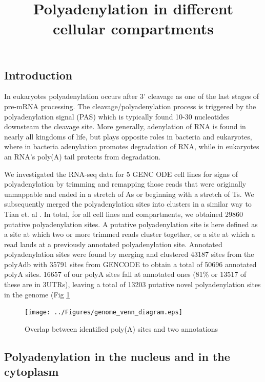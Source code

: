 \documentclass[a4paper]{article}
\title{Polyadenylation in different cellular compartments}
\begin{document}
 

\maketitle

\subsection{Introduction}
In eukaryotes polyadenylation occurs after 3' cleavage as one
of the last stages of pre-mRNA processing. The cleavage/polyadenylation process
is triggered by the polyadenylation signal (PAS) which is typically found 10-30
nucleotides downsteam the cleavage site. More generally, adenylation of RNA is
found in nearly all kingdoms of life, but plays opposite roles in bacteria and
eukaryotes, where in bacteria adenylation promotes degradation of RNA, while in
eukaryotes an RNA's poly(A) tail protects from degradation.

We investigated the RNA-seq data for 5 GENC ODE cell lines for signs of
polyadenylation by trimming and remapping those reads that were originally
unmappable and ended in a stretch of As or beginning with a stretch of Ts. We
subsequently merged the polyadenylation sites into clusters in a similar way to
Tian et. al \cite{tian_large-scale_2005}. In total, for all cell lines and
compartments, we obtained 29860 putative polyadenylation sites. A putative
polyadenylation site is here defined as a site at which two or more trimmed
reads cluster together, or a site at which a read lands at a previously
annotated polyadenylation site. Annotated polyadenylation sites were found by
merging and clustered 43187 sites from the polyAdb \cite{park_design_2007} with
35791 sites from GENCODE to obtain a total of 50696 annotated polyA sites.
16657 of our polyA sites fall at annotated ones (81\% or 13517 of these are in
3UTRs), leaving a total of 13203 putative novel polyadenylation sites in the
genome (Fig \ref{fig:Venn}

\begin{figure}[h]
	\centering
		\texttt{[image: ../Figures/genome\_venn\_diagram.eps]}
	\caption{Overlap between identified poly(A) sites and two annotations}
	\label{fig:Venn}
\end{figure}
\subsection{Polyadenylation in the nucleus and in the cytoplasm}
\end{document}
